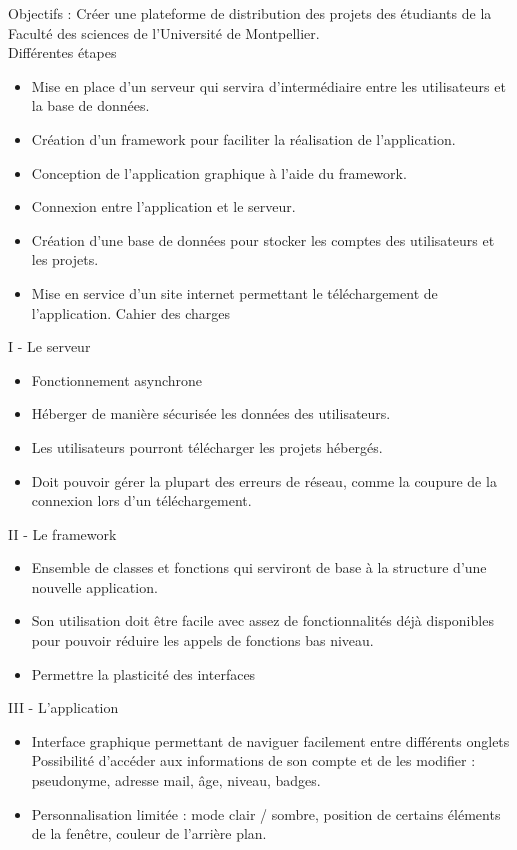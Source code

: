 \documentclass{report}
\begin{document}
Objectifs : Créer une plateforme de distribution des projets des étudiants de la Faculté des
sciences de l'Université de Montpellier.\\
Différentes étapes\\
\begin{itemize}
    \item Mise en place d’un serveur qui servira d’intermédiaire entre les utilisateurs et la
base de données.
    \item Création d’un framework pour faciliter la réalisation de l’application.
    \item Conception de l’application graphique à l’aide du framework.
    \item Connexion entre l’application et le serveur.
    \item Création d’une base de données pour stocker les comptes des utilisateurs et les
projets.
    \item Mise en service d’un site internet permettant le téléchargement de l’application.
Cahier des charges
\end{itemize}
I - Le serveur
\begin{itemize}
    \item Fonctionnement asynchrone
    \item Héberger de manière sécurisée les données des utilisateurs.
    \item Les utilisateurs pourront télécharger les projets hébergés.
    \item Doit pouvoir gérer la plupart des erreurs de réseau, comme la coupure de la
    connexion lors d’un téléchargement.
\end{itemize}
II - Le framework
\begin{itemize}
    \item Ensemble de classes et fonctions qui serviront de base à la structure d’une nouvelle
application.
    \item Son utilisation doit être facile avec assez de fonctionnalités déjà disponibles pour
    pouvoir réduire les appels de fonctions bas niveau.
    \item Permettre la plasticité des interfaces
\end{itemize}
III - L’application
\begin{itemize}
    \item Interface graphique permettant de naviguer facilement entre différents onglets
Possibilité d'accéder aux informations de son compte et de les modifier :
pseudonyme, adresse mail, âge, niveau, badges.
    \item Personnalisation limitée : mode clair / sombre, position de certains éléments de la
fenêtre, couleur de l’arrière plan.
\end{itemize}
\end{document}
